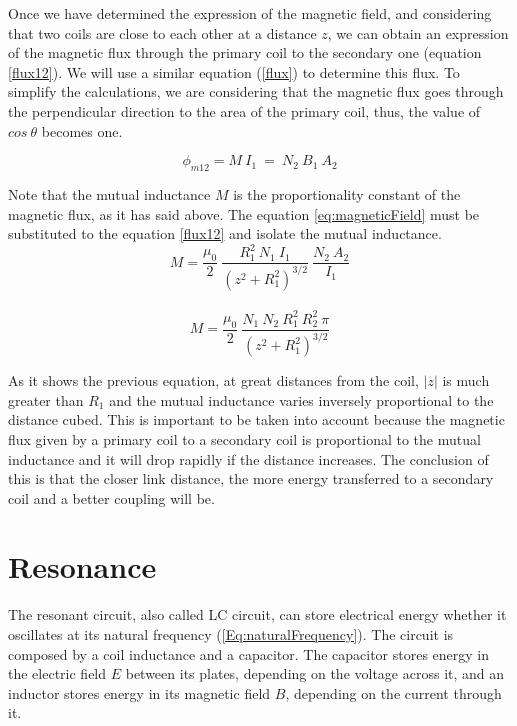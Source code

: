Once we have determined the expression of the magnetic field, and considering that two coils are close to each other at a distance $z$, we can obtain an expression of the magnetic flux through the primary coil to the secondary one (equation \ref{flux12}). We will use a similar equation (\ref{flux}) to determine this flux. To simplify the calculations, we are considering that the magnetic flux goes through the perpendicular direction to the area of the primary coil, thus, the value of $cos\:\theta$ becomes one. 

\begin{equation}
\phi_{m12}=M\:I_1\:=\:N_2\:B_1\:A_2
\label{flux12}
\end{equation}

Note that the mutual inductance $M$ is the proportionality constant of the magnetic flux, as it has said above. The equation \ref{eq:magneticField} must be substituted to the equation \ref{flux12} and isolate the mutual inductance.
\begin{equation*}
M=\frac{\mu_0}{2}\:\frac{R_{1}^2\:N_1\:I_1}{(z^2+R_{1}^2)^{3/2}}\:\frac{N_2\:A_2}{I_1}
\end{equation*} \\
\begin{equation}
M=\frac{\mu_0}{2}\:\frac{N_1\:N_2\:R_{1}^2\:R_{2}^2\:\pi}{(z^2+R_{1}^2)^{3/2}}
\end{equation}

As it shows the previous equation, at great distances from the coil, $|z|$ is much greater than $R_1$ and the mutual inductance varies inversely proportional to the distance cubed. This is important to be taken into account because the magnetic flux given by a primary coil to a secondary coil is proportional to the mutual inductance and it will drop rapidly if the distance increases. The conclusion of this is that the closer link distance, the more energy transferred to a secondary coil and a better coupling will be.

	\section{Resonance}\label{sec:resonance}
The resonant circuit, also called LC circuit, can store electrical energy whether it oscillates at its natural frequency (\ref{Eq:naturalFrequency}). The circuit is composed by a coil inductance and a capacitor. The capacitor stores energy in the electric field $E$ between its plates, depending on the voltage across it, and an inductor stores energy in its magnetic field $B$, depending on the current through it. 

